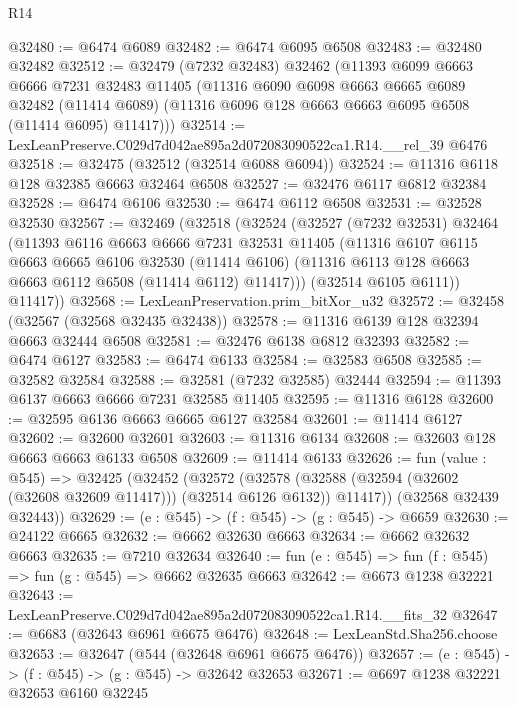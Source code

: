 \begin{lexlean}{R14}
\begin{coremodule}
@32480 := @6474 @6089
@32482 := @6474 @6095 @6508
@32483 := @32480 @32482
@32512 := @32479
    (@7232 @32483)
    @32462
    (@11393
      @6099
      @6663
      @6666
      @7231
      @32483
      @11405
      (@11316
        @6090
        @6098
        @6663
        @6665
        @6089
        @32482
        (@11414 @6089)
        (@11316 @6096 @128 @6663 @6663 @6095 @6508 (@11414 @6095) @11417)))
@32514 := LexLeanPreserve.C029d7d042ae895a2d072083090522ca1.R14.__rel_39 @6476
@32518 := @32475 (@32512 (@32514 @6088 @6094))
@32524 := @11316 @6118 @128 @32385 @6663 @32464 @6508
@32527 := @32476 @6117 @6812 @32384
@32528 := @6474 @6106
@32530 := @6474 @6112 @6508
@32531 := @32528 @32530
@32567 := @32469
    (@32518
      (@32524
        (@32527
          (@7232 @32531)
          @32464
          (@11393
            @6116
            @6663
            @6666
            @7231
            @32531
            @11405
            (@11316
              @6107
              @6115
              @6663
              @6665
              @6106
              @32530
              (@11414 @6106)
              (@11316 @6113 @128 @6663 @6663 @6112 @6508 (@11414 @6112) @11417)))
          (@32514 @6105 @6111))
        @11417))
@32568 := LexLeanPreservation.prim_bitXor_u32
@32572 := @32458 (@32567 (@32568 @32435 @32438))
@32578 := @11316 @6139 @128 @32394 @6663 @32444 @6508
@32581 := @32476 @6138 @6812 @32393
@32582 := @6474 @6127
@32583 := @6474 @6133
@32584 := @32583 @6508
@32585 := @32582 @32584
@32588 := @32581 (@7232 @32585) @32444
@32594 := @11393 @6137 @6663 @6666 @7231 @32585 @11405
@32595 := @11316 @6128
@32600 := @32595 @6136 @6663 @6665 @6127 @32584
@32601 := @11414 @6127
@32602 := @32600 @32601
@32603 := @11316 @6134
@32608 := @32603 @128 @6663 @6663 @6133 @6508
@32609 := @11414 @6133
@32626 := fun (value : @545) =>
  @32425
    (@32452
      (@32572
        (@32578 (@32588 (@32594 (@32602 (@32608 @32609 @11417))) (@32514 @6126 @6132)) @11417))
      (@32568 @32439 @32443))
@32629 := (e : @545) -> (f : @545) -> (g : @545) -> @6659
@32630 := @24122 @6665
@32632 := @6662 @32630 @6663
@32634 := @6662 @32632 @6663
@32635 := @7210 @32634
@32640 := fun (e : @545) => fun (f : @545) => fun (g : @545) => @6662 @32635 @6663
@32642 := @6673 @1238 @32221
@32643 := LexLeanPreserve.C029d7d042ae895a2d072083090522ca1.R14.__fits_32
@32647 := @6683 (@32643 @6961 @6675 @6476)
@32648 := LexLeanStd.Sha256.choose
@32653 := @32647 (@544 (@32648 @6961 @6675 @6476))
@32657 := (e : @545) -> (f : @545) -> (g : @545) -> @32642 @32653
@32671 := @6697
    @1238
    @32221
    @32653
    @6160
    @32245

\end{coremodule}
\end{lexlean}
